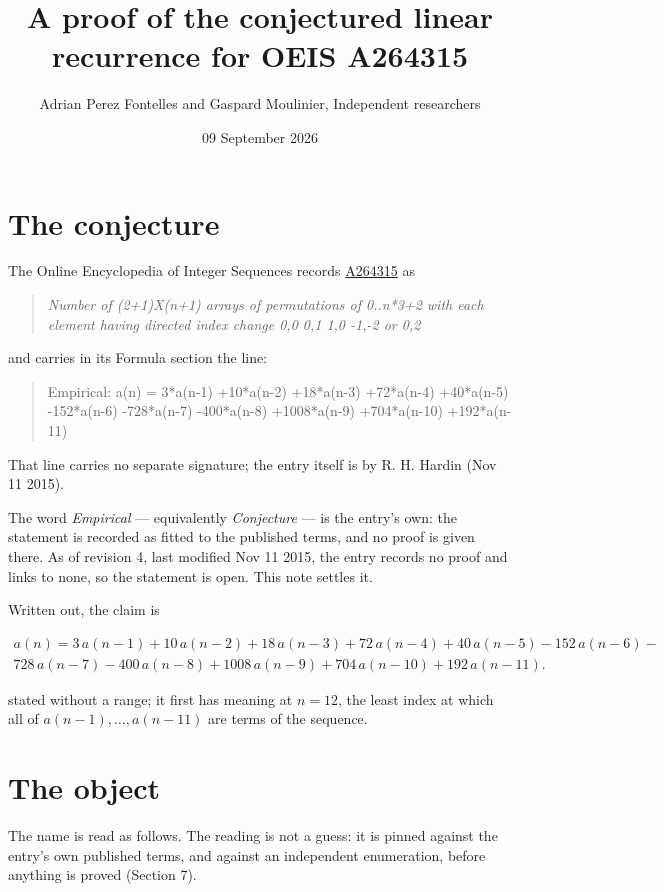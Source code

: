 \documentclass[11pt]{article}
\title{A proof of the conjectured linear recurrence for OEIS A264315}
\author{Adrian Perez Fontelles and Gaspard Moulinier, Independent researchers}
\date{09 September 2026}
\theoremstyle{definition}
\begin{document}
\maketitle
\section{The conjecture}

The Online Encyclopedia of Integer Sequences records \href{https://oeis.org/A264315}{A264315} as

\begin{quote}\itshape Number of (2+1)X(n+1) arrays of permutations of 0..n*3+2 with each element having directed index change 0,0 0,1 1,0 -1,-2 or 0,2\end{quote}

and carries in its Formula section the line:

\begin{quote}\ttfamily Empirical: a(n) = 3*a(n-1) +10*a(n-2) +18*a(n-3) +72*a(n-4) +40*a(n-5) -152*a(n-6) -728*a(n-7) -400*a(n-8) +1008*a(n-9) +704*a(n-10) +192*a(n-11)\end{quote}

That line carries no separate signature; the entry itself is by R. H. Hardin (Nov 11 2015).

The word {\itshape Empirical} --- equivalently {\itshape Conjecture} --- is the entry's own: the statement is recorded as fitted to the published terms, and no proof is given there. As of revision 4, last modified Nov 11 2015, the entry records no proof and links to none, so the statement is open. This note settles it.

Written out, the claim is

\begin{multline*} a(n) = 3\,a(n-1) + 10\,a(n-2) + 18\,a(n-3) + 72\,a(n-4) + 40\,a(n-5) - 152\,a(n-6) - \\ 728\,a(n-7) - 400\,a(n-8) + 1008\,a(n-9) + 704\,a(n-10) + 192\,a(n-11). \end{multline*}

stated without a range; it first has meaning at $n = 12$, the least index at which all of $a(n-1),\dots,a(n-11)$ are terms of the sequence.

\section{The object}

The name is read as follows. The reading is not a guess: it is pinned against the entry's own published terms, and against an independent enumeration, before anything is proved (Section 7).
\end{document}
